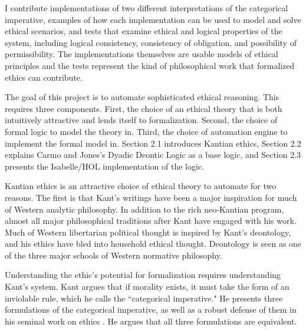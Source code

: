 \begin{isabellebody}
\begin{isamarkuptext}
I contribute implementations of two different interpretations of the categorical imperative, 
examples of how each implementation can be used to model and solve ethical scenarios, and tests that
examine ethical and logical properties of the system, including logical consistency, consistency
of obligation, and possibility of permissibility. The implementations themselves are usable models 
of ethical principles and the tests represent the kind of philosophical work that formalized ethics 
can contribute.%
\end{isamarkuptext}\isamarkuptrue%
%
\isadelimdocument
%
\endisadelimdocument
%
\isatagdocument
%
\isamarkuptrue%
%
\endisatagdocument
{\isafolddocument}%
%
\isadelimdocument
%
\endisadelimdocument
%
\begin{isamarkuptext}%
The goal of this project is to automate sophisticated ethical reasoning. This requires three
components. First, the choice of an ethical theory that is both intuitively attractive and 
lends itself to formalization. Second, the choice of formal logic to model the theory in. Third, the 
choice of automation engine to implement the formal model in. Section 2.1 introduces Kantian
ethics, Section 2.2 explains Carmo and Jones's Dyadic Deontic Logic \cite{CJDDL} as a 
base logic, and Section 2.3 presents the Isabelle/HOL implementation of the logic.%
\end{isamarkuptext}\isamarkuptrue%
%
\isadelimdocument
%
\endisadelimdocument
%
\isatagdocument
%
\isamarkuptrue%
%
\endisatagdocument
{\isafolddocument}%
%
\isadelimdocument
%
\endisadelimdocument
%
\begin{isamarkuptext}%
Kantian ethics is an attractive choice of ethical theory to automate for two reasons. The 
first is that Kant's writings have been a major inspiration for much of Western analytic philosophy. 
In addition to the rich neo-Kantian program, almost all major philosophical traditions after Kant have
engaged with his work. Much of Western libertarian political thought is inspired by Kant's deontology,
and his ethics have bled into household ethical thought. Deontology is seen as one of the three major 
schools of Western normative philosophy.

Understanding the ethic's potential for formalization requires understanding Kant's system. Kant argues 
that if morality exists, it must take the form of an inviolable rule, which he calls the ``categorical
imperative." He presents three formulations of the categorical imperative, as well as a robust defense
of them in his seminal work on ethics \cite{groundwork}. He argues that all three formulations are 
equivalent. 


\end{isamarkuptext}
\end{isabellebody}

